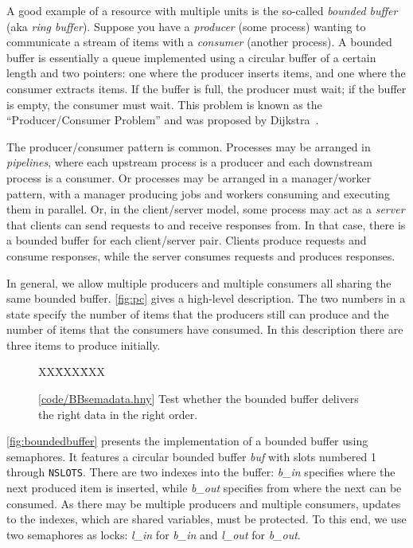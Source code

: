 \documentclass{report}
\newcommand{\harmonysource}[1]{
\begin{tabbing}
XX\=XXX\=XXX\kill
    
\end{tabbing}
}
\newcommand{\harmonylink}[1]{%
[\href{https://www.cs.cornell.edu/home/rvr/harmony/#1}{\underline{#1}}]%
}
\newenvironment{code}{
\tcolorbox
}{
\endtcolorbox
}
\begin{document}
A good example of a resource with multiple units is the
so-called \emph{bounded buffer} (aka \emph{ring buffer}).
%
Suppose you have a \emph{producer} (some process) wanting to
communicate a stream of items with a \emph{consumer} (another process).
A bounded buffer is essentially
a queue implemented using a circular buffer
%
of a certain length and two pointers:
one where the producer inserts items, and one where the consumer extracts
items.  If the
buffer is full, the producer must wait; if the buffer is empty, the
consumer must wait.
This problem is known as the ``Producer/Consumer Problem'' and was
proposed by Dijkstra~\cite{EWD329}.

The producer/consumer pattern is common.  Processes may be arranged
in \emph{pipelines},
%
where each upstream process is a producer and each downstream
process is a consumer.
Or processes may be arranged in a manager/worker pattern, with a manager
producing jobs and workers consuming and executing them in parallel.
Or, in the client/server model,
%
some process may act as a \emph{server} that clients can send requests to
and receive responses from.  In that case, there is a bounded buffer
for each client/server pair. Clients produce requests and
consume responses, while the server consumes requests and produces responses.

In general, we allow multiple producers and multiple consumers
all sharing the same bounded buffer.
\autoref{fig:pc} gives a high-level description.  The
two numbers in a state specify
the number of items that the producers still can produce and
the number of items that the consumers have consumed.  In this
description there are three items to produce initially.

\begin{figure}
\begin{code}
\harmonysource{BBsemadata}
\end{code}
\caption{\harmonylink{code/BBsemadata.hny} Test whether the bounded buffer delivers the right data in the
right order.}
\label{fig:BBsemadata}
\end{figure}

\autoref{fig:boundedbuffer} presents the implementation of a bounded
buffer using semaphores.  It features a circular bounded buffer \textit{buf} with
slots numbered 1 through \texttt{NSLOTS}.  There are two indexes into
the buffer: \textit{b\_in} specifies where the next produced item is inserted,
while \textit{b\_out} specifies from where the next can be consumed.
As there may be multiple producers and multiple
consumers, updates to the indexes, which are shared variables, must be protected.
To this end, we use two semaphores as locks: \textit{l\_in} for \textit{b\_in}
and \textit{l\_out} for \textit{b\_out}.
\end{document}
